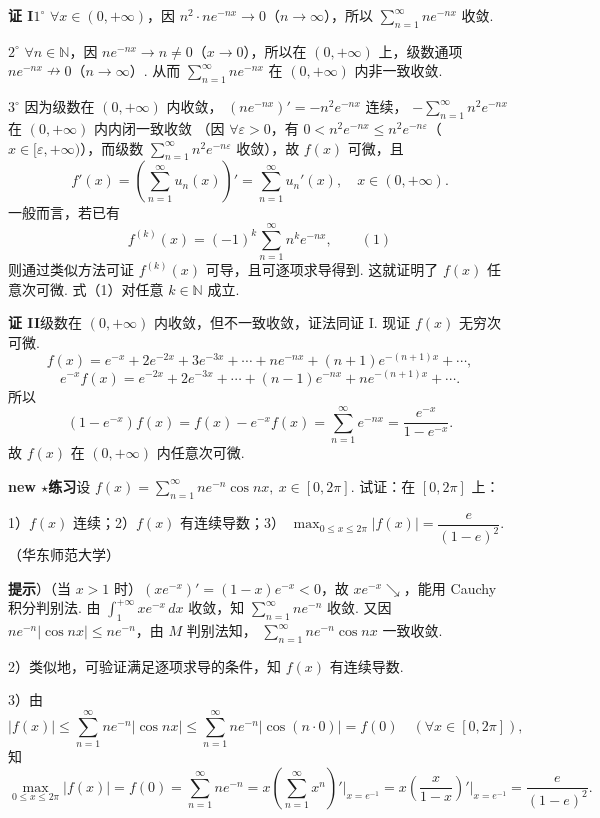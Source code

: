 \documentclass[UTF8, 12pt, fontset=fandol, oneside]{ctexart}
\begin{document}
\noindent\textbf{证 I}\quad $1^\circ$ $\forall x\in(0,+\infty)$，因
$n^2\cdot ne^{-nx}\to0$（$n\to\infty$），所以
$\displaystyle\sum_{n=1}^{\infty}ne^{-nx}$ 收敛.

$2^\circ$ $\forall n\in\mathbb N$，因 $ne^{-nx}\to n\ne0$（$x\to0$），所以在
$(0,+\infty)$ 上，级数通项 $ne^{-nx}\nrightarrow0$（$n\to\infty$）. 从而
$\displaystyle\sum_{n=1}^{\infty}ne^{-nx}$ 在 $(0,+\infty)$ 内非一致收敛.

$3^\circ$ 因为级数在 $(0,+\infty)$ 内收敛，
$(ne^{-nx})'=-n^2e^{-nx}$ 连续，
$-\displaystyle\sum_{n=1}^{\infty}n^2e^{-nx}$ 在 $(0,+\infty)$ 内内闭一致收敛
（因 $\forall\varepsilon>0$，有
$0<n^2e^{-nx}\le n^2e^{-n\varepsilon}$（$x\in[\varepsilon,+\infty)$），而级数
$\displaystyle\sum_{n=1}^{\infty}n^2e^{-n\varepsilon}$ 收敛），故 $f(x)$ 可微，且
\[
  f'(x)=\left(\sum_{n=1}^{\infty}u_n(x)\right)'
  =\sum_{n=1}^{\infty}u_n'(x),\quad x\in(0,+\infty).
\]
一般而言，若已有
\[
  f^{(k)}(x)=(-1)^k\sum_{n=1}^{\infty}n^ke^{-nx},
\qquad(1)
\]
则通过类似方法可证 $f^{(k)}(x)$ 可导，且可逐项求导得到. 这就证明了 $f(x)$ 任意次可微.
式（1）对任意 $k\in\mathbb N$ 成立.

\noindent\textbf{证 II}\quad 级数在 $(0,+\infty)$ 内收敛，但不一致收敛，证法同证 I. 现证
$f(x)$ 无穷次可微.
\[
  f(x)=e^{-x}+2e^{-2x}+3e^{-3x}+\cdots+ne^{-nx}+(n+1)e^{-(n+1)x}+\cdots,
\]
\[
  e^{-x}f(x)=e^{-2x}+2e^{-3x}+\cdots+(n-1)e^{-nx}+ne^{-(n+1)x}+\cdots.
\]
所以
\[
  (1-e^{-x})f(x)=f(x)-e^{-x}f(x)
  =\sum_{n=1}^{\infty}e^{-nx}=\frac{e^{-x}}{1-e^{-x}}.
\]
故 $f(x)$ 在 $(0,+\infty)$ 内任意次可微.

\noindent\textbf{new $\star$练习}\quad 设
$f(x)=\displaystyle\sum_{n=1}^{\infty}ne^{-n}\cos nx,\ x\in[0,2\pi]$. 试证：在
$[0,2\pi]$ 上：

1）$f(x)$ 连续；2）$f(x)$ 有连续导数；3）
$\displaystyle\max_{0\le x\le2\pi}|f(x)|=\dfrac{e}{(1-e)^2}$.（华东师范大学）

\noindent\textbf{提示}）（当 $x>1$ 时）$(xe^{-x})'=(1-x)e^{-x}<0$，故
$xe^{-x}\searrow$，能用 Cauchy 积分判别法. 由 $\displaystyle\int_1^{+\infty}xe^{-x}\,dx$
收敛，知 $\displaystyle\sum_{n=1}^{\infty}ne^{-n}$ 收敛. 又因
$ne^{-n}|\cos nx|\le ne^{-n}$，由 $M$ 判别法知，
$\displaystyle\sum_{n=1}^{\infty}ne^{-n}\cos nx$ 一致收敛.

2）类似地，可验证满足逐项求导的条件，知 $f(x)$ 有连续导数.

3）由
\[
  |f(x)|\le \sum_{n=1}^{\infty}ne^{-n}|\cos nx|
  \le \sum_{n=1}^{\infty}ne^{-n}|\cos(n\cdot0)|=f(0)\quad(\forall x\in[0,2\pi]),
\]
知
\[
  \max_{0\le x\le2\pi}|f(x)|=f(0)
  =\sum_{n=1}^{\infty}ne^{-n}
  =x\left(\sum_{n=1}^{\infty}x^n\right)'\bigg|_{x=e^{-1}}
  =x\left(\frac{x}{1-x}\right)'\bigg|_{x=e^{-1}}
  =\frac{e}{(1-e)^2}.
\]
\end{document}
